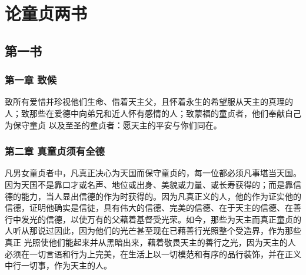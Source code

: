 
\chapter{论童贞两书}



\section{第一书}


\subsection{第一章 致候}

致所有爱惜并珍视他们生命、借着天主父，且怀着永生的希望服从天主的真理的人；致那些在爱德中向弟兄和近人怀有感情的人；致蒙福的童贞者，他们奉献自己为保守童贞 以及至圣的童贞者：愿天主的平安与你们同在。\par


\subsection{第二章 真童贞须有全德}

凡男女童贞者中，凡真正决心为天国而保守童贞的，每一位都必须凡事堪当天国。因为天国不是靠口才或名声、地位或出身、美貌或力量、或长寿获得的；而是靠信德的能力，当人显出信德的作为时获得的。因为凡真正义的人，他的作为证实他的信德，证明他确实是信徒，具有伟大的信德、完美的信德、在于天主的信德、在善行中发光的信德，以使万有的父藉着基督受光荣。如今，那些为天主而真正童贞的人听从那说过因此，因为他们的光芒甚至现在已藉善行光照整个受造界，作为那些真正 光照使他们能起来并从黑暗出来，藉着敬畏天主的善行之光，因为天主的人必须在一切言语和行为上完美，在生活上以一切模范和有序的品行装饰，并在正义中行一切事，作为天主的人。\par

